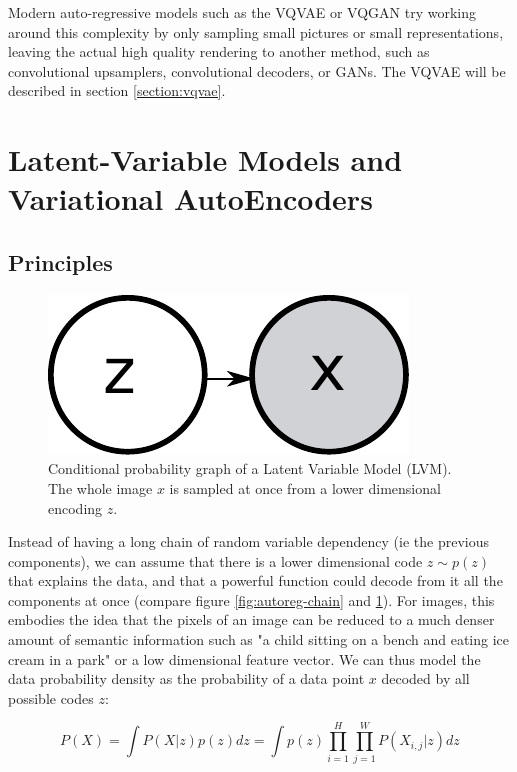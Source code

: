 Modern auto-regressive models such as the \ac{VQVAE} \citep{vqvae} or \ac{VQGAN} \citep{vqgan} try working around this complexity by only sampling small pictures or small representations, leaving the actual high quality rendering to another method, such as convolutional upsamplers, convolutional decoders, or \acp{GAN}. The \ac{VQVAE} will be described in section \ref{section:vqvae}.

\section{Latent-Variable Models and Variational AutoEncoders}
\subsection{Principles}

\begin{figure}[ht]
    \centering
    \includegraphics[scale=0.5]{60-files/chain-vae.pdf}
    \caption{Conditional probability graph of a Latent Variable Model (LVM). The whole image $x$ is sampled at once from a lower dimensional encoding $z$.}
    \label{fig:vae-chain}
\end{figure}

Instead of having a long chain of random variable dependency (ie the previous components), we can assume that there is a lower dimensional code $z \sim p(z)$ that explains the data, and that a powerful function could decode from it all the components at once (compare figure \ref{fig:autoreg-chain} and \ref{fig:vae-chain}). For images, this embodies the idea that the pixels of an image can be reduced to a much denser amount of semantic information such as "a child sitting on a bench and eating ice cream in a park" or a low dimensional feature vector. We can thus model the data probability density as the probability of a data point $x$ decoded by all possible codes $z$:

\begin{equation}
    P(X) = \int P(X | z)p(z)dz = \int p(z) \prod_{i=1}^H \prod_{j=1}^W P(X_{i,j} | z) dz
\end{equation}

